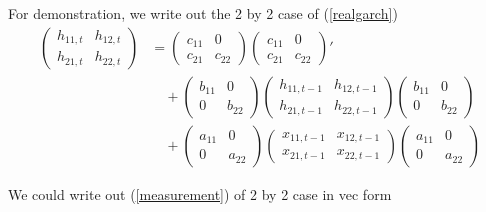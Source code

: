 \documentclass[titlepage,11pt]{article}
\begin{document}
For demonstration, we write out the 2 by 2 case of  (\ref{realgarch}) 
\begin{align*}
 \left(\begin{array}{cc}
h_{11,t} & h_{12,t} \\
h_{21,t} & h_{22,t} 
\end{array}\right) 
&= \left( \begin{array}{cc}
c_{11} & 0 \\
c_{21} & c_{22} 
\end{array} \right)\left( \begin{array}{cc}
c_{11} & 0 \\
c_{21} & c_{22} 
\end{array} \right)' 
\\ & \quad + \left( \begin{array}{cc}
b_{11} & 0 \\
0 & b_{22} 
\end{array} \right)\left(\begin{array}{cc}
h_{11,t-1} & h_{12,t-1} \\
h_{21,t-1} & h_{22,t-1} 
\end{array}\right)\left( \begin{array}{cc}
b_{11} & 0 \\
0 & b_{22} 
\end{array} \right)
\\ & \quad + \left( \begin{array}{cc}
a_{11} & 0 \\
0 & a_{22} 
\end{array} \right)\left(\begin{array}{cc}
x_{11,t-1} & x_{12,t-1} \\
x_{21,t-1} & x_{22,t-1} 
\end{array}\right)\left( \begin{array}{cc}
a_{11} & 0 \\
0 & a_{22} 
\end{array} \right)
\end{align*}

We could write out (\ref{measurement}) of 2 by 2 case in vec form 
\end{document}
